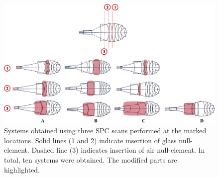 \begin{figure}[h!]
    \centering
    \includegraphics[width=\textwidth]{chapter-4/figures/vollrathWDSPC.png}
    \caption{Systems obtained using three SPC scans performed at the marked locations. Solid lines (\textcircled{\scriptsize{1}} and \textcircled{\scriptsize{2}}) indicate insertion of glass null-element. Dashed line (\textcircled{\scriptsize{3}}) indicates insertion of air null-element. In total, ten systems were obtained. The modified parts are highlighted.}
    \label{fig: vollrathWDSPC}
\end{figure}

